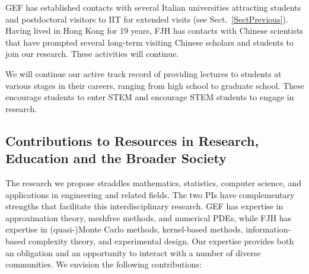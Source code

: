 \documentclass[11pt]{NSFamsart}
\begin{document}
\begin{description}[leftmargin=0ex]
\item[Supervising Visitors]
GEF has established contacts with several Italian universities attracting students and postdoctoral visitors to IIT for extended visits (see Sect.~\ref{SectPrevious}). Having lived in Hong Kong for 19 years, FJH has contacts with Chinese scientists that have prompted several long-term visiting Chinese scholars and students to join our research.  These activities will continue.

\item[Giving Short Courses and Invited Lectures]
We will continue our active track record of providing lectures to students at various stages in their careers, ranging from high school to graduate school. These encourage students to enter STEM and encourage STEM students to engage in research.

\end{description}

\subsection{Contributions to Resources in Research, Education and the Broader Society}

The research we propose straddles mathematics, statistics, computer science, and applications in engineering and related fields.  The two PIs have complementary strengths that facilitate this interdisciplinary research.  GEF has expertise in approximation theory, meshfree methods, and numerical PDEs, while FJH has expertise in (quasi-)Monte Carlo methods, kernel-based methods, information-based complexity theory, and experimental design. Our expertise provides both an obligation and an opportunity to interact with a number of diverse communities. We envision the following contributions:
\end{document}
